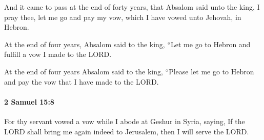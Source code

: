 			\begin{versebox}
					\item[BHS] 
					\item[ASV] And it came to pass at the end of forty years, that Absalom said unto the king, I pray thee, let me go and pay my vow, which I have vowed unto Jehovah, in Hebron.
					\item[NIV] At the end of four years, Absalom said to the king, “Let me go to Hebron and fulfill a vow I made to the LORD.
					\item[NRSV] At the end of four years Absalom said to the king, “Please let me go to Hebron and pay the vow that I have made to the LORD.
			\end{versebox}

		\paragraph{2 Samuel 15:8} %
			\label{2SAMUEL-15-8}

			For thy servant vowed a vow while I abode at Geshur in Syria, saying, If the LORD shall bring me again indeed to Jerusalem, then I will serve the LORD.

